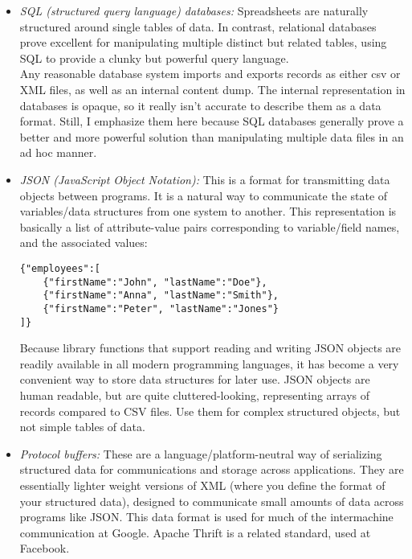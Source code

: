 \documentclass[10pt]{article}
\begin{document}
\begin{itemize}
  \item \textit{SQL (structured query language) databases:} Spreadsheets are naturally structured around single tables of data. In contrast, relational databases prove excellent for manipulating multiple distinct but related tables, using SQL to provide a clunky but powerful query language.\\
Any reasonable database system imports and exports records as either csv or XML files, as well as an internal content dump. The internal representation in databases is opaque, so it really isn't accurate to describe them as a data format. Still, I emphasize them here because SQL databases generally prove a better and more powerful solution than manipulating multiple data files in an ad hoc manner.
  
  \item \textit{JSON (JavaScript Object Notation):} This is a format for transmitting data objects between programs. It is a natural way to communicate the state of variables/data structures from one system to another. This representation is basically a list of attribute-value pairs corresponding to variable/field names, and the associated values:
\begin{verbatim}
{"employees":[
    {"firstName":"John", "lastName":"Doe"},
    {"firstName":"Anna", "lastName":"Smith"},
    {"firstName":"Peter", "lastName":"Jones"}
]}
\end{verbatim}
Because library functions that support reading and writing JSON objects are readily available in all modern programming languages, it has become a very convenient way to store data structures for later use. JSON objects are human readable, but are quite cluttered-looking, representing arrays of records compared to CSV files. Use them for complex structured objects, but not simple tables of data.
  
  \item \textit{Protocol buffers:} These are a language/platform-neutral way of serializing structured data for communications and storage across applications. They are essentially lighter weight versions of XML (where you define the format of your structured data), designed to communicate small amounts of data across programs like JSON. This data format is used for much of the intermachine communication at Google. Apache Thrift is a related standard, used at Facebook.
\end{itemize}
\end{document}
